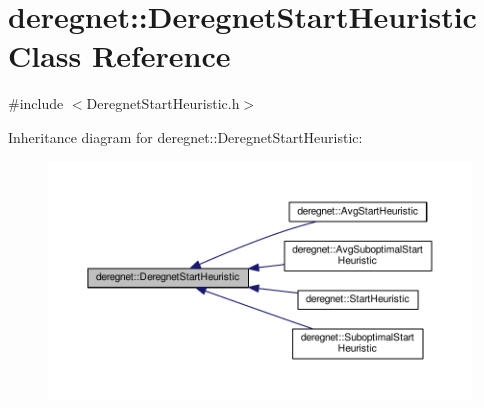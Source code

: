 \hypertarget{classderegnet_1_1DeregnetStartHeuristic}{}\section{deregnet\+:\+:Deregnet\+Start\+Heuristic Class Reference}
\label{classderegnet_1_1DeregnetStartHeuristic}


{\ttfamily \#include $<$Deregnet\+Start\+Heuristic.\+h$>$}



Inheritance diagram for deregnet\+:\+:Deregnet\+Start\+Heuristic\+:\nopagebreak
\begin{figure}[H]
\begin{center}
\leavevmode
\includegraphics[width=350pt]{classderegnet_1_1DeregnetStartHeuristic__inherit__graph}
\end{center}
\end{figure}
